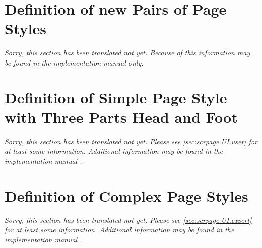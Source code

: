 \begin{Declaration}
  \\
  \\
  \\
\end{Declaration}
%
%
%
%
%
%
%
%
%

\begin{Declaration}
  \\
  \\
\end{Declaration}
%
%
%
%
%
%
%


\section{Definition of new Pairs of Page Styles}
\label{sec:scrlayer-scrpage.pagestyle.pairs}

\emph{Sorry, this section has been translated not yet. Because of this
  information may be found in the implementation manual
   only.}

\section{Definition of Simple Page Style with Three Parts Head and Foot }
\label{sec:scrlayer-scrpage.pagestyle.triple}

\emph{Sorry, this section has been translated not yet. Please see
  \autoref{sec:scrpage.UI.user} for at least some
  information. Additional information may be found in the implementation
  manual .}

\section{Definition of Complex Page Styles}
\label{sec:scrlayer-scrpage.pagestyle.experts}
 
\emph{Sorry, this section has been translated not yet. Please see
  \autoref{sec:scrpage.UI.expert} for at least some
  information. Additional information may be found in the implementation
  manual .}

%
%

